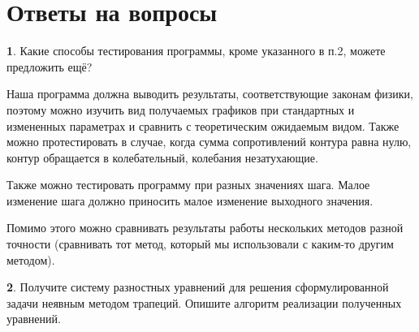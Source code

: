 \documentclass[a4paper,oneside,12pt]{extreport}
\begin{document}
\newpage
\section{Ответы на вопросы}

\textbf{1}. Какие способы тестирования программы, кроме указанного в п.2, можете предложить
ещё?

Наша программа должна выводить результаты, соответствующие законам физики, 
поэтому можно изучить вид получаемых графиков при стандартных и 
измененных параметрах и сравнить с теоретическим ожидаемым видом.
Также можно протестировать в случае, когда сумма сопротивлений контура равна нулю, 
контур обращается в колебательный, колебания незатухающие.

Также можно тестировать программу при разных значениях шага. 
Малое изменение шага должно приносить малое изменение выходного значения. 

Помимо этого можно сравнивать результаты работы нескольких методов разной точности 
(сравнивать тот метод, который мы использовали с каким-то другим методом).  

\textbf{2}. Получите систему разностных уравнений для решения
сформулированной задачи неявным методом трапеций.
Опишите алгоритм реализации полученных уравнений.

\begin{figure}[ht!]
\end{figure}
\end{document}
